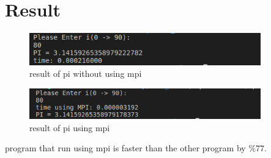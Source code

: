 \documentclass[pdftex,10pt,a4paper,oneside]{article}
\begin{document}
\section{Result}
\begin{figure}[H]
  \centering
  \includegraphics[width=100mm,scale=5]{image2.png}
  \caption{result of pi without using mpi}
  \label{a}

\end{figure}
\begin{figure}[H]
  \centering
  \includegraphics[width=100mm,scale=5]{image1.png}
  \caption{result of pi using mpi}
  \label{a}

\end{figure}
program that run using mpi is faster than the other program by $\%77$.
\end{document}
